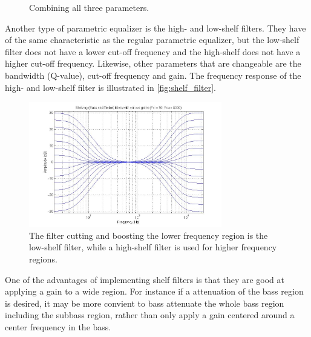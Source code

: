 \begin{figure}[H]
\centering
{}

\caption{Combining all three parameters.}
\label{fig:parametric_eq_preanalysis_comb}
\end{figure}



Another type of parametric equalizer is the high- and low-shelf filters. They have of the same characteristic as the regular parametric equalizer, but the low-shelf filter does not have a lower cut-off frequency and the high-shelf does not have a higher cut-off frequency. Likewise, other parameters that are changeable are the bandwidth (Q-value), cut-off frequency and gain. The frequency response of the high- and low-shelf filter is illustrated in \autoref{fig:shelf_filter}.

\begin{figure}[H]
\centering
\includegraphics[width=0.75\textwidth]{figures/shelf_filter.jpg}
\caption{The filter cutting and boosting the lower frequency region is the low-shelf filter, while a high-shelf filter is used for higher frequency regions.}
\label{fig:shelf_filter}
\end{figure}


One of the advantages of implementing shelf filters is that they are good at applying a gain to a wide region. For instance if a attenuation of the bass region is desired, it may be more convient to bass attenuate the whole bass region including the subbass region, rather than only apply a gain centered around a center frequency in the bass.

